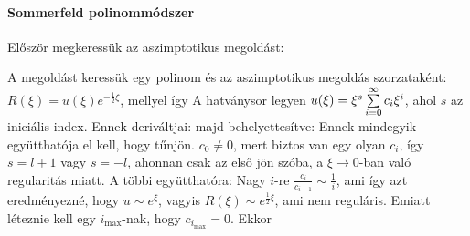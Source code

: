    \paragraph{Sommerfeld polinommódszer}
    
    Először megkeressük az aszimptotikus megoldást:
    
    A megoldást keressük egy polinom és az aszimptotikus megoldás szorzataként: $R(\xi)=u(\xi)e^{-\frac{1}{2}\xi}$, mellyel
    így
    A hatványsor legyen $u(\xi)=\xi^s\sum\limits_{i=0}^{\infty}c_i\xi^i$, ahol $s$ az iniciális index. Ennek deriváltjai:
    majd behelyettesítve:
    Ennek mindegyik együtthatója el kell, hogy tűnjön. $c_0\ne 0$, mert biztos van egy olyan $c_i$, így $s=l+1$ vagy $s=-l$, ahonnan csak az első jön szóba, a $\xi\to 0$-ban való regularitás miatt. A többi együtthatóra:
    Nagy $i$-re $\frac{c_i}{c_{i-1}}\sim\frac{1}{i}$, ami így azt eredményezné, hogy $u\sim e^{\xi}$, vagyis $R(\xi)\sim e^{\frac{1}{2}\xi}$, ami nem reguláris. Emiatt léteznie kell egy $i_\text{max}$-nak, hogy $c_{i_\text{max}}=0$. Ekkor 
